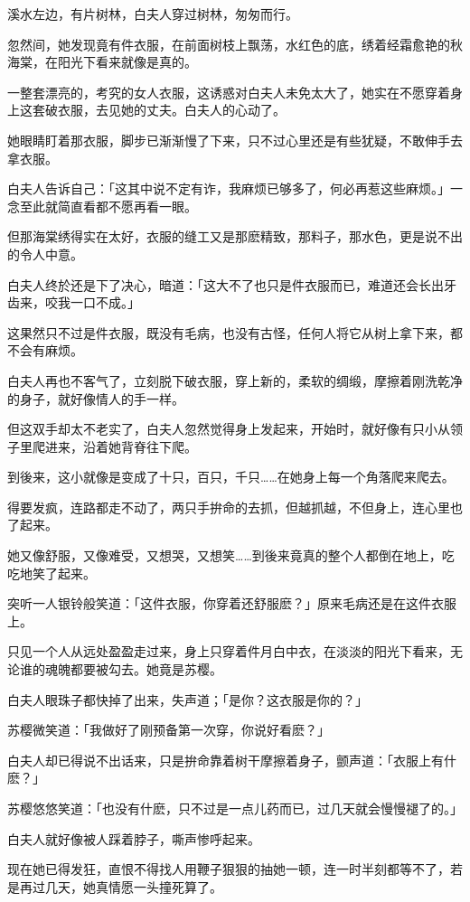 \documentclass[12pt,oneside]{book}
\begin{document}
溪水左边，有片树林，白夫人穿过树林，匆匆而行。

忽然间，她发现竟有件衣服，在前面树枝上飘荡，水红色的底，绣着经霜愈艳的秋海棠，在阳光下看来就像是真的。

一整套漂亮的，考究的女人衣服，这诱惑对白夫人未免太大了，她实在不愿穿着身上这套破衣服，去见她的丈夫。白夫人的心动了。

她眼睛盯着那衣服，脚步已渐渐慢了下来，只不过心里还是有些犹疑，不敢伸手去拿衣服。

白夫人告诉自己：「这其中说不定有诈，我麻烦已够多了，何必再惹这些麻烦。」一念至此就简直看都不愿再看一眼。

但那海棠绣得实在太好，衣服的缝工又是那麽精致，那料子，那水色，更是说不出的令人中意。

白夫人终於还是下了决心，暗道：「这大不了也只是件衣服而已，难道还会长出牙齿来，咬我一口不成。」

这果然只不过是件衣服，既没有毛病，也没有古怪，任何人将它从树上拿下来，都不会有麻烦。

白夫人再也不客气了，立刻脱下破衣服，穿上新的，柔软的绸缎，摩擦着刚洗乾净的身子，就好像情人的手一样。

但这双手却太不老实了，白夫人忽然觉得身上发起来，开始时，就好像有只小从领子里爬进来，沿着她背脊往下爬。

到後来，这小就像是变成了十只，百只，千只\ldots\ldots 在她身上每一个角落爬来爬去。

得要发疯，连路都走不动了，两只手拚命的去抓，但越抓越，不但身上，连心里也了起来。

她又像舒服，又像难受，又想哭，又想笑\ldots\ldots 到後来竟真的整个人都倒在地上，吃吃地笑了起来。

突听一人银铃般笑道：「这件衣服，你穿着还舒服麽？」原来毛病还是在这件衣服上。

只见一个人从远处盈盈走过来，身上只穿着件月白中衣，在淡淡的阳光下看来，无论谁的魂魄都要被勾去。她竟是苏樱。

白夫人眼珠子都快掉了出来，失声道；「是你？这衣服是你的？」

苏樱微笑道：「我做好了刚预备第一次穿，你说好看麽？」

白夫人却已得说不出话来，只是拚命靠着树干摩擦着身子，颤声道：「衣服上有什麽？」

苏樱悠悠笑道：「也没有什麽，只不过是一点儿药而已，过几天就会慢慢褪了的。」

白夫人就好像被人踩着脖子，嘶声惨呼起来。

现在她已得发狂，直恨不得找人用鞭子狠狠的抽她一顿，连一时半刻都等不了，若是再过几天，她真情愿一头撞死算了。
\end{document}
